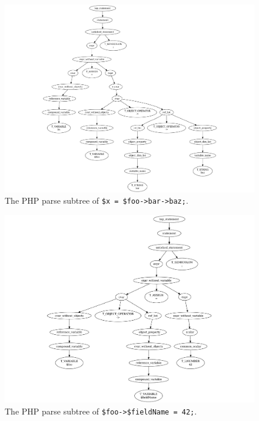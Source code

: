 \begin{figure}[htb]
  \begin{center}
    \includegraphics[scale=0.6]{images/multi-level-field-access-right}
   \caption{The PHP parse subtree of \texttt{\$x = \$foo->bar->baz;}.}
   \label{fig:multi-level-field-access-right}
  \end{center}
\end{figure}

\begin{figure}[htb]
  \begin{center}
    \includegraphics[scale=0.6]{images/variable-field-access-left}
   \caption{The PHP parse subtree of \texttt{\$foo->\$fieldName = 42;}.}
   \label{fig:variable-field-access-left}
  \end{center}
\end{figure}

